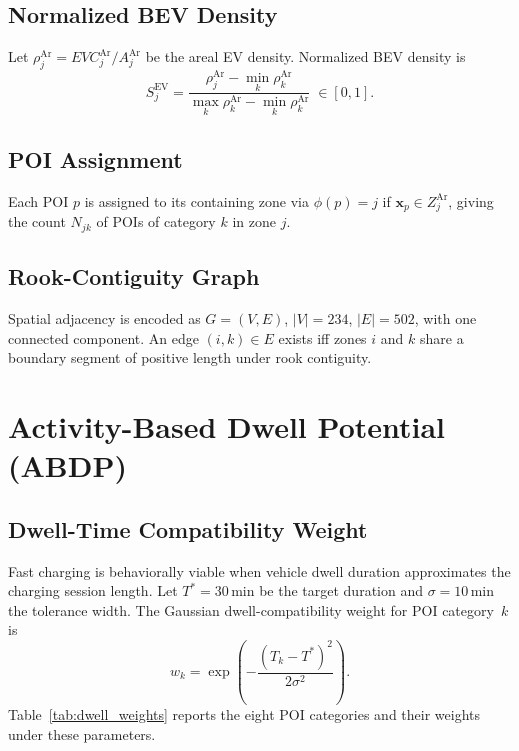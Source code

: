 \documentclass[conference]{IEEEtran}
\begin{document}
\subsection{Normalized BEV Density}
Let $\rho^{\mathrm{Ar}}_j = EVC^{\mathrm{Ar}}_j / A^{\mathrm{Ar}}_j$
be the areal EV density.
Normalized BEV density is
\begin{equation}
S^{\mathrm{EV}}_j =
\frac{\rho^{\mathrm{Ar}}_j - \min_k \rho^{\mathrm{Ar}}_k}
     {\max_k \rho^{\mathrm{Ar}}_k - \min_k \rho^{\mathrm{Ar}}_k}
\;\in[0,1].
\end{equation}

\subsection{POI Assignment}
Each POI $p$ is assigned to its containing zone via
$\phi(p)=j$ if $\mathbf{x}_p\in Z^{\mathrm{Ar}}_j$,
giving the count $N_{jk}$ of POIs of category $k$ in zone $j$.

\subsection{Rook-Contiguity Graph}
Spatial adjacency is encoded as
$G=(V,E)$, $|V|=234$, $|E|=502$,
with one connected component.
An edge $(i,k)\in E$ exists iff zones $i$ and $k$ share a boundary
segment of positive length under rook contiguity.

\section{Activity-Based Dwell Potential (ABDP)}

\subsection{Dwell-Time Compatibility Weight}
Fast charging is behaviorally viable when vehicle dwell duration
approximates the charging session length.
Let $T^*=30$\,min be the target duration and $\sigma=10$\,min the
tolerance width.
The Gaussian dwell-compatibility weight for POI category~$k$ is
\begin{equation}
w_k =
\exp\!\left(-\frac{(T_k - T^*)^2}{2\sigma^2}\right).
\label{eq:w_k}
\end{equation}
Table~\ref{tab:dwell_weights} reports the eight POI categories and their
weights under these parameters.
\end{document}
